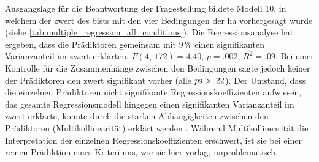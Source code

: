 \documentclass[11pt, twoside, a4paper]{book}		%
\begin{document}
Ausgangslage für die Beantwortung der Fragestellung bildete Modell 10, in welchem der \gls{zwert} des \gls{bist}s mit den vier Bedingungen der \gls{ha} vorhergesagt wurde (siehe \autoref{tab:multiple_regression_all_conditions}). Die Regressionsanalyse hat ergeben, dass die Prädiktoren gemeinsam mit $9\,\%$ einen signifikanten Varianzanteil im \gls{zwert} erklärten, $F(4,\,172)=4.40$, $p=.002$, $R^2=.09$. Bei einer Kontrolle für die Zusammenhänge zwischen den Bedingungen sagte jedoch keiner der Prädiktoren den \gls{zwert} signifikant vorher (alle $p\textnormal{s}>.22$). Der Umstand, dass die einzelnen Prädiktoren nicht signifikante Regressionskoeffizienten aufwiesen, das gesamte Regressionsmodell hingegen einen signifikanten Varianzanteil im \gls{zwert} erklärte, konnte durch die starken Abhängigkeiten zwischen den Prädiktoren (Multikollinearität) erklärt werden \citep[S. 686]{Eid2013}. Während Multikollinearität die Interpretation der einzelnen Regressionskoeffizienten erschwert, ist sie bei einer reinen Prädiktion eines Kriteriums, wie sie hier vorlag, unproblematisch.
\end{document}
